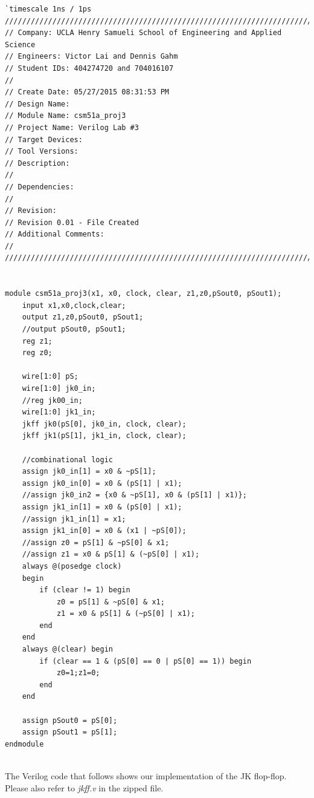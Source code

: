\documentclass{article}
\begin{document}
\begin{verbatim}
`timescale 1ns / 1ps
/////////////////////////////////////////////////////////////////////////////
// Company: UCLA Henry Samueli School of Engineering and Applied Science
// Engineers: Victor Lai and Dennis Gahm
// Student IDs: 404274720 and 704016107
// 
// Create Date: 05/27/2015 08:31:53 PM
// Design Name: 
// Module Name: csm51a_proj3
// Project Name: Verilog Lab #3
// Target Devices: 
// Tool Versions: 
// Description: 
// 
// Dependencies: 
// 
// Revision:
// Revision 0.01 - File Created
// Additional Comments:
// 
/////////////////////////////////////////////////////////////////////////////


module csm51a_proj3(x1, x0, clock, clear, z1,z0,pSout0, pSout1);
    input x1,x0,clock,clear;
    output z1,z0,pSout0, pSout1;
    //output pSout0, pSout1;    
    reg z1;
    reg z0;
	
    wire[1:0] pS;
    wire[1:0] jk0_in;
    //reg jk00_in;
    wire[1:0] jk1_in;
    jkff jk0(pS[0], jk0_in, clock, clear);
    jkff jk1(pS[1], jk1_in, clock, clear);
    
    //combinational logic
    assign jk0_in[1] = x0 & ~pS[1];
    assign jk0_in[0] = x0 & (pS[1] | x1);
    //assign jk0_in2 = {x0 & ~pS[1], x0 & (pS[1] | x1)};
    assign jk1_in[1] = x0 & (pS[0] | x1);
    //assign jk1_in[1] = x1;
    assign jk1_in[0] = x0 & (x1 | ~pS[0]);
    //assign z0 = pS[1] & ~pS[0] & x1;
    //assign z1 = x0 & pS[1] & (~pS[0] | x1);
    always @(posedge clock)
    begin
        if (clear != 1) begin
            z0 = pS[1] & ~pS[0] & x1;
            z1 = x0 & pS[1] & (~pS[0] | x1);
        end
    end
    always @(clear) begin
        if (clear == 1 & (pS[0] == 0 | pS[0] == 1)) begin
            z0=1;z1=0;
        end
    end
    
    assign pSout0 = pS[0];
    assign pSout1 = pS[1];
endmodule


\end{verbatim}

The Verilog code that follows shows our implementation of the JK flop-flop. 
Please also refer to \textit{jkff.v} in the zipped file.\\
\end{document}
